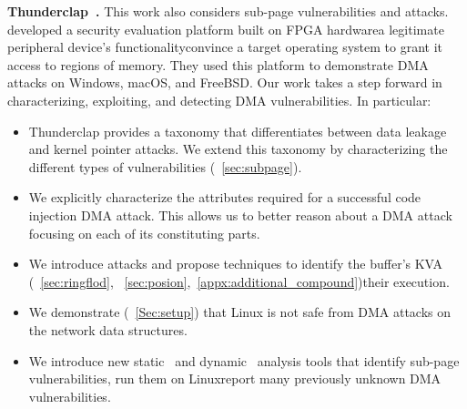 \smallskip
\noindent\textbf{Thunderclap~\cite{thunder}.} This work also considers sub-page vulnerabilities and \simple attacks. \DIFdelbegin {}\DIFdelend \DIFaddbegin {}\DIFaddend developed a security evaluation platform built on FPGA hardware\DIFdelbegin {}\DIFdelend \DIFaddbegin {}\DIFaddend a legitimate peripheral device's functionality\DIFdelbegin {}\DIFdelend \DIFaddbegin {}\DIFaddend convince a target operating system to grant it access to regions of memory. They used this platform to demonstrate \simple DMA attacks on Windows, macOS, and FreeBSD.
Our work takes a step forward in characterizing, exploiting, and detecting DMA vulnerabilities. In particular:
\begin{itemize}

    \item Thunderclap provides a taxonomy that differentiates between data leakage and kernel pointer attacks. We extend this taxonomy by characterizing the different types of \subpage vulnerabilities (\DIFdelbegin {}\DIFdelend \DIFaddbegin {}\DIFaddend ~\ref{sec:subpage}).

    \item We explicitly characterize the attributes required for a successful code injection DMA attack. This allows us to better reason about a DMA attack focusing \DIFaddbegin {}\DIFaddend on each of its constituting parts\DIFdelbegin {}\DIFdelend . 

    \item We introduce \compound attacks and propose techniques to identify the buffer's KVA (\DIFdelbegin {}\DIFdelend \DIFaddbegin {}\DIFaddend ~\ref{sec:ringflod}, ~\ref{sec:posion},~\ref{appx:additional_compound})\DIFdelbegin {}\DIFdelend \DIFaddbegin {}\DIFaddend their execution.

    \item We demonstrate (\DIFdelbegin {}\DIFdelend \DIFaddbegin {}\DIFaddend ~\ref{Sec:setup}) that Linux is not safe from DMA attacks on the network data structures.

    \item We introduce new static~\cite{SPADE} and dynamic~\cite{DKASAN} analysis tools that identify sub-page vulnerabilities, run them on Linux\DIFdelbegin {}\DIFdelend \DIFaddbegin {}\DIFaddend report many previously unknown DMA vulnerabilities.

\end{itemize}






